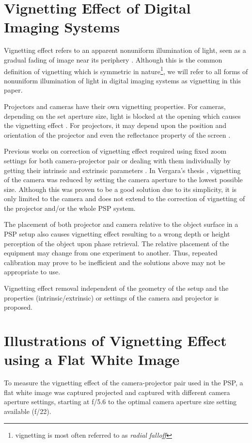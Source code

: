 \section{Vignetting Effect of Digital Imaging Systems}

Vignetting effect refers to an apparent nonuniform illumination of light, seen as a gradual fading of image near its periphery \cite{Zheng2008}. 
Although this is the common definition of vignetting which is symmetric in nature\footnote{vignetting is most often referred to as \textit{radial falloff}}, we will refer to all forms of	 nonuniform illumination of light in digital imaging systems as vignetting in this paper.

Projectors and cameras have their own vignetting properties. 
For cameras, depending on the set aperture size, light is blocked at the opening which causes the vignetting effect \cite{Hecht2002}. 
For projectors, it may depend upon the position and orientation of the projector and even the reflectance property of the screen \cite{Juang2007}. 

Previous works on correction of vignetting effect required using fixed zoom settings for both camera-projector pair \cite{Juang2007} or dealing with them individually by getting their intrinsic and extrinsic parameters \cite{Goldman2010}. 
In Vergara's thesis \cite{Vergara2010}, vignetting of the camera was reduced by setting the camera aperture to the lowest possible size. Although this was proven to be a good solution due to its simplicity, it is only limited to the camera and does not extend to the correction of vignetting of the projector and/or the whole PSP system.

The placement of both projector and camera relative to the object surface in a PSP setup also causes vignetting effect resulting to a wrong depth or height perception of the object upon phase retrieval. The relative placement of the equipment may change from one experiment to another. 
Thus, repeated calibration may prove to be inefficient and the solutions above may not be appropriate to use. 

Vignetting effect removal independent of the geometry of the setup and the properties (intrinsic/extrinsic) or settings of the camera and projector is proposed. 

\section{Illustrations of Vignetting Effect using a Flat White Image}
To measure the vignetting effect of the camera-projector pair used in the PSP, a flat white image was captured projected and captured with different camera aperture settings, starting at f/5.6 to the optimal camera aperture size setting available (f/22). 


